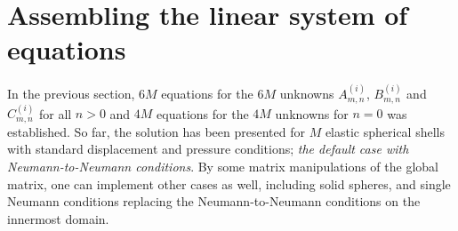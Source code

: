 \section{Assembling the linear system of equations}
\label{Sec1:assembly}
In the previous section, $6M$ equations for the $6M$ unknowns $A_{m,n}^{(i)}$, $B_{m,n}^{(i)}$ and $C_{m,n}^{(i)}$ for all $n>0$ and $4M$ equations for the $4M$ unknowns for $n = 0$ was established. So far, the solution has been presented for $M$ elastic spherical shells with standard displacement and pressure conditions; \textit{the default case with Neumann-to-Neumann conditions}. By some matrix manipulations of the global matrix, one can implement other cases as well, including solid spheres, and single Neumann conditions replacing the Neumann-to-Neumann conditions on the innermost domain.

